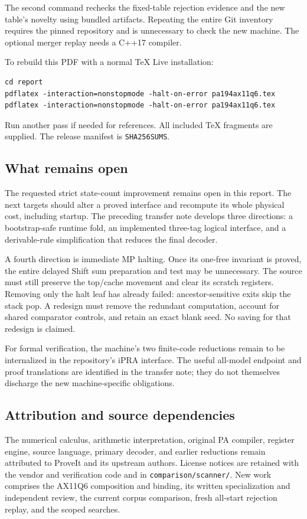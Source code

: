 \documentclass[10pt,letterpaper]{article}
\newcommand{\file}[1]{\texttt{\nolinkurl{#1}}}
\begin{document}
The second command rechecks the fixed-table rejection evidence and
the new table's novelty using bundled artifacts. Repeating the entire
Git inventory requires the pinned repository and is unnecessary to check
the new machine. The optional merger replay needs a C++17 compiler.

To rebuild this PDF with a normal TeX Live installation:
\begin{Verbatim}[fontsize=\small]
cd report
pdflatex -interaction=nonstopmode -halt-on-error pa194ax11q6.tex
pdflatex -interaction=nonstopmode -halt-on-error pa194ax11q6.tex
\end{Verbatim}
Run another pass if needed for references. All included TeX fragments
are supplied. The release manifest is \file{SHA256SUMS}.

\subsection{What remains open}

The requested strict state-count improvement remains open in this report.
The next targets should alter a proved interface and recompute its whole
physical cost, including startup. The preceding transfer note develops
three directions: a bootstrap-safe runtime fold, an implemented three-tag
logical interface, and a derivable-rule simplification that reduces the
final decoder.

A fourth direction is immediate MP halting. Once its one-free invariant
is proved, the entire delayed Shift sum preparation and test may be
unnecessary. The source must still preserve the top/cache movement and
clear its scratch registers. Removing only the halt leaf has already
failed: ancestor-sensitive exits skip the stack pop. A redesign must
remove the redundant computation, account for shared comparator controls,
and retain an exact blank seed. No saving for that redesign is claimed.

For formal verification, the machine's two finite-code reductions remain
to be internalized in the repository's iPRA interface. The useful
all-model endpoint and proof translations are identified in the transfer
note; they do not themselves discharge the new machine-specific obligations.

\subsection{Attribution and source dependencies}

The numerical calculus, arithmetic interpretation, original PA compiler,
register engine, source language, primary decoder, and earlier reductions
remain attributed to ProveIt and its upstream authors. License notices
are retained with the vendor and verification code and in
\file{comparison/scanner/}. New work comprises the AX11Q6 composition and
binding, its written specialization and independent review, the current
corpus comparison, fresh all-start rejection replay, and the scoped searches.
\end{document}
